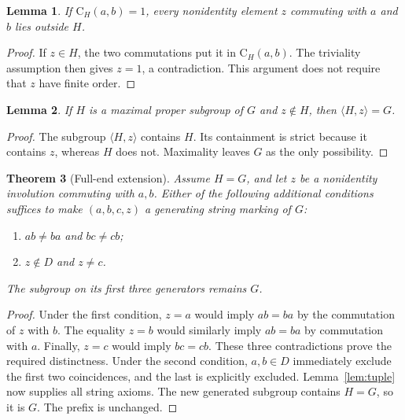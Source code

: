 \documentclass[11pt]{article}
\newtheorem{theorem}{Theorem}
\newtheorem{lemma}[theorem]{Lemma}
\newcommand{\gen}[1]{\langle #1\rangle}
\newcommand{\CG}{\mathrm C}
\begin{document}
\begin{lemma}\label{lem:outside}
If $\CG_H(a,b)=1$, every nonidentity element $z$ commuting with $a$ and
$b$ lies outside $H$.
\end{lemma}
\begin{proof}
If $z\in H$, the two commutations put it in $\CG_H(a,b)$. The
triviality assumption then gives $z=1$, a contradiction. This argument
does not require that $z$ have finite order.
\end{proof}

\begin{lemma}\label{lem:generation}
If $H$ is a maximal proper subgroup of $G$ and $z\notin H$, then
$\gen{H,z}=G$.
\end{lemma}
\begin{proof}
The subgroup $\gen{H,z}$ contains $H$. Its containment is strict because
it contains $z$, whereas $H$ does not. Maximality leaves $G$ as the only
possibility.
\end{proof}

\begin{theorem}[Full-end extension]\label{thm:full}
Assume $H=G$, and let $z$ be a nonidentity involution commuting with
$a,b$. Either of the following additional conditions suffices to make
$(a,b,c,z)$ a generating string marking of $G$:
\begin{enumerate}
\item $ab\ne ba$ and $bc\ne cb$;
\item $z\notin D$ and $z\ne c$.
\end{enumerate}
The subgroup on its first three generators remains $G$.
\end{theorem}
\begin{proof}
Under the first condition, $z=a$ would imply $ab=ba$ by the commutation
of $z$ with $b$. The equality $z=b$ would similarly imply $ab=ba$ by
commutation with $a$. Finally, $z=c$ would imply $bc=cb$. These three
contradictions prove the required distinctness. Under the second
condition, $a,b\in D$ immediately exclude the first two coincidences,
and the last is explicitly excluded. Lemma~\ref{lem:tuple} now supplies
all string axioms. The new generated subgroup contains $H=G$, so it is
$G$. The prefix is unchanged.
\end{proof}
\end{document}
